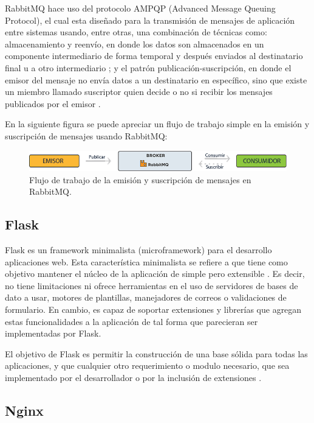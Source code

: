RabbitMQ hace uso del protocolo AMPQP (Advanced Message Queuing Protocol), el cual esta diseñado para la transmisión
de mensajes de aplicación entre sistemas usando, entre otras, una combinación de técnicas como: almacenamiento y reenvío, en donde
los datos son almacenados en un componente intermediario de forma temporal y después enviados al destinatario final u a otro
intermediario \cite{15}; y el patrón publicación-suscripción, en donde el emisor del mensaje no envía datos a un destinatario
en específico, sino que existe un miembro llamado suscriptor quien decide o no si recibir los mensajes publicados por el emisor \cite{16}.

En la siguiente figura se puede apreciar un flujo de trabajo simple en la emisión y suscripción de mensajes usando RabbitMQ:

\begin{figure}[H]
	\centering
		\includegraphics[width=1\textwidth]{figures/workflow_rabbitmq}
	\caption{Flujo de trabajo de la emisión y suscripción de mensajes en RabbitMQ.}
	\label{fig:workflow_rabbitmq}
\end{figure}

\subsection{Flask}

Flask es un framework minimalista (microframework) para el desarrollo aplicaciones
web. Esta característica minimalista se refiere a que tiene como objetivo mantener
el núcleo de la aplicación de simple pero extensible \cite{19}.
Es decir, no tiene limitaciones ni ofrece herramientas en el uso de servidores de
bases de dato a usar, motores de plantillas, manejadores de correos o validaciones de
formulario. En cambio, es capaz de soportar extensiones y librerías que agregan
estas funcionalidades a la aplicación de tal forma que parecieran ser implementadas por Flask.

El objetivo de Flask es permitir la construcción de una base sólida para todas las
aplicaciones, y que cualquier otro requerimiento o modulo necesario, que sea
implementado por el desarrollador o por la inclusión de extensiones \cite{20}.

\subsection{Nginx}

